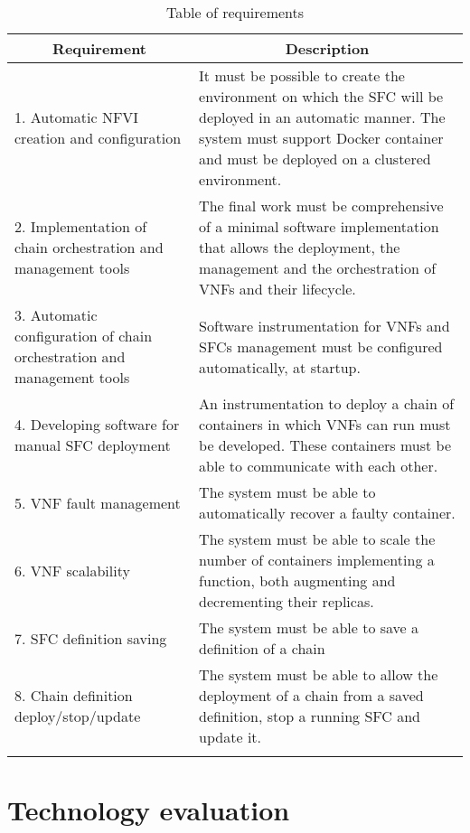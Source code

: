\begin{longtable}[c]{p{}p{}}
\hline
\multicolumn{1}{c}{\textbf{Requirement}}                               &
\multicolumn{1}{c}{\textbf{Description}}                               \\ \hline
\endhead
%
\hline
\endfoot
%
\endlastfoot
%
1. Automatic NFVI creation and configuration &
It must be possible to create the environment on which the SFC will be deployed
in an automatic manner. The system must support Docker container and must be
deployed on a clustered environment. \\
2. Implementation of chain orchestration and management tools &
The final work must be comprehensive of a minimal software implementation that
allows the deployment, the management and the orchestration of VNFs and their
lifecycle. \\
3. Automatic configuration of chain orchestration and management tools &
Software instrumentation for VNFs and SFCs management must be configured
automatically, at startup. \\
4. Developing software for manual SFC deployment &
An instrumentation to deploy a chain of containers in which VNFs can run must
be developed. These containers must be able to communicate with each
other. \\
5. VNF fault management &
The system must be able to automatically recover a faulty container. \\
6. VNF scalability &
The system must be able to scale the number of containers implementing a
function, both augmenting and decrementing their replicas. \\
7. SFC definition saving &
The system must be able to save a definition of a chain \\
8. Chain definition deploy/stop/update & The system must be able to allow the
deployment of a chain from a saved definition, stop a running SFC and update
it. \\
\hline
\caption{Table of requirements}
\label{chap:prjan:tab:req}\\
\end{longtable}

\section{Technology evaluation}

